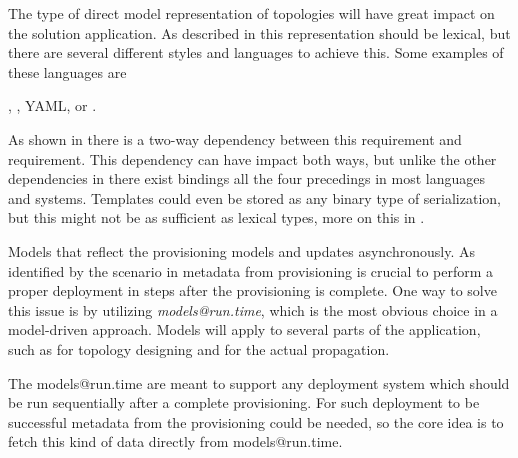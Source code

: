 The type of direct model representation of topologies will have great impact 
on the solution application.
As described in  this representation should be lexical,
but there are several different styles and languages to achieve this.
Some examples of these languages are 
\begin{ii}
  \iitem {},
  \iitem {},
  \iitem YAML,
  \iitem {} or
  \iitem {}.
\end{ii}
As shown in  there is a two-way dependency between 
this requirement and  requirement.
This dependency can have impact both ways, but unlike the other dependencies in
 there exist bindings all the four precedings in
most languages and systems.
Templates could even be stored as any binary type of serialization, 
but this might not be as sufficient as lexical types, more on this
in .

Models that reflect the provisioning models and updates asynchronously. 
As identified by the scenario in  metadata from provisioning is crucial to perform
a proper deployment in steps after the provisioning is complete.
One way to solve this issue is by utilizing \emph{models@run.time}, which is the most obvious choice in a
model-driven approach.
Models will apply to several parts of the application, such as for topology designing and for the actual propagation.

The models@run.time are meant to support any deployment system which should
be run sequentially after a complete provisioning.
For such deployment to be successful metadata from the provisioning could be needed,
so the core idea is to fetch this kind of data directly from models@run.time.

